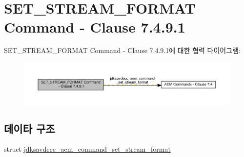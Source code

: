 \hypertarget{group__command__set__stream__format}{}\section{S\+E\+T\+\_\+\+S\+T\+R\+E\+A\+M\+\_\+\+F\+O\+R\+M\+AT Command -\/ Clause 7.4.9.1}
\label{group__command__set__stream__format}
S\+E\+T\+\_\+\+S\+T\+R\+E\+A\+M\+\_\+\+F\+O\+R\+M\+AT Command -\/ Clause 7.4.9.1에 대한 협력 다이어그램\+:
\nopagebreak
\begin{figure}[H]
\begin{center}
\leavevmode
\includegraphics[width=350pt]{group__command__set__stream__format}
\end{center}
\end{figure}
\subsection*{데이타 구조}
\begin{DoxyCompactItemize}
\item 
struct \hyperlink{structjdksavdecc__aem__command__set__stream__format}{jdksavdecc\+\_\+aem\+\_\+command\+\_\+set\+\_\+stream\+\_\+format}
\end{DoxyCompactItemize}

